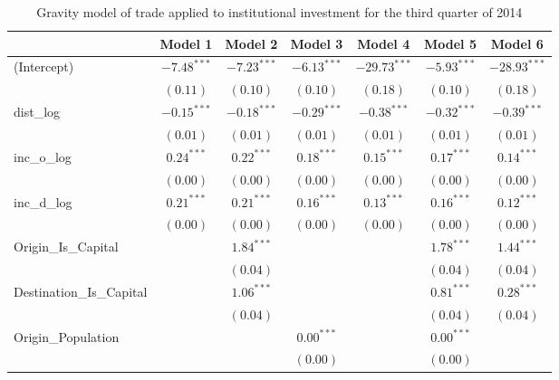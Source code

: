 \begin{table}
	\small
	\caption[CGravity Model of Trade for Q3 2014]{Gravity model of trade applied to institutional investment for the third quarter of 2014}
	\begin{center}
		\begin{tabular}{l c c c c c c }
			\hline
			& Model 1 & Model 2 & Model 3 & Model 4 & Model 5 & Model 6 \\
			\hline
			(Intercept)                  & $-7.48^{***}$ & $-7.23^{***}$ & $-6.13^{***}$ & $-29.73^{***}$ & $-5.93^{***}$ & $-28.93^{***}$ \\
			& $(0.11)$      & $(0.10)$      & $(0.10)$      & $(0.18)$       & $(0.10)$      & $(0.18)$       \\
			dist\_log                    & $-0.15^{***}$ & $-0.18^{***}$ & $-0.29^{***}$ & $-0.38^{***}$  & $-0.32^{***}$ & $-0.39^{***}$  \\
			& $(0.01)$      & $(0.01)$      & $(0.01)$      & $(0.01)$       & $(0.01)$      & $(0.01)$       \\
			inc\_o\_log                  & $0.24^{***}$  & $0.22^{***}$  & $0.18^{***}$  & $0.15^{***}$   & $0.17^{***}$  & $0.14^{***}$   \\
			& $(0.00)$      & $(0.00)$      & $(0.00)$      & $(0.00)$       & $(0.00)$      & $(0.00)$       \\
			inc\_d\_log                  & $0.21^{***}$  & $0.21^{***}$  & $0.16^{***}$  & $0.13^{***}$   & $0.16^{***}$  & $0.12^{***}$   \\
			& $(0.00)$      & $(0.00)$      & $(0.00)$      & $(0.00)$       & $(0.00)$      & $(0.00)$       \\
			Origin\_Is\_Capital          &               & $1.84^{***}$  &               &                & $1.78^{***}$  & $1.44^{***}$   \\
			&               & $(0.04)$      &               &                & $(0.04)$      & $(0.04)$       \\
			Destination\_Is\_Capital     &               & $1.06^{***}$  &               &                & $0.81^{***}$  & $0.28^{***}$   \\
			&               & $(0.04)$      &               &                & $(0.04)$      & $(0.04)$       \\
			Origin\_Population           &               &               & $0.00^{***}$  &                & $0.00^{***}$  &                \\
			&               &               & $(0.00)$      &                & $(0.00)$      &                \\

\end{tabular}
\end{center}
\end{table}
